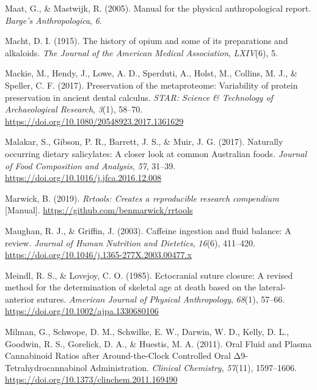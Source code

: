 \documentclass[
  11pt,
  leqno]{scrartcl}
\newlength{\cslhangindent}
\newenvironment{CSLReferences}[2] %
 {\begin{list}{}{%
  \setlength{\itemindent}{0pt}
  \setlength{\leftmargin}{0pt}
  \setlength{\parsep}{0pt}
  \ifodd #1
   \setlength{\leftmargin}{\cslhangindent}
   \setlength{\itemindent}{-1\cslhangindent}
  \fi
  \setlength{\itemsep}{#2\baselineskip}}}
 {\end{list}}
\begin{document}
\begin{CSLReferences}{1}{0}
Maat, G., \& Mastwijk, R. (2005). Manual for the physical
anthropological report. \emph{Barge's Anthropologica}, \emph{6}.

Macht, D. I. (1915). The history of opium and some of its preparations
and alkaloids. \emph{The Journal of the American Medical Association},
\emph{LXIV}(6), 5.

Mackie, M., Hendy, J., Lowe, A. D., Sperduti, A., Holst, M., Collins, M.
J., \& Speller, C. F. (2017). Preservation of the metaproteome:
Variability of protein preservation in ancient dental calculus.
\emph{STAR: Science \& Technology of Archaeological Research},
\emph{3}(1), 58--70. \url{https://doi.org/10.1080/20548923.2017.1361629}

Malakar, S., Gibson, P. R., Barrett, J. S., \& Muir, J. G. (2017).
Naturally occurring dietary salicylates: {A} closer look at common
{Australian} foods. \emph{Journal of Food Composition and Analysis},
\emph{57}, 31--39. \url{https://doi.org/10.1016/j.jfca.2016.12.008}

Marwick, B. (2019). \emph{Rrtools: {Creates} a reproducible research
compendium} {[}Manual{]}. \url{https://github.com/benmarwick/rrtools}

Maughan, R. J., \& Griffin, J. (2003). Caffeine ingestion and fluid
balance: A review. \emph{Journal of Human Nutrition and Dietetics},
\emph{16}(6), 411--420.
\url{https://doi.org/10.1046/j.1365-277X.2003.00477.x}

Meindl, R. S., \& Lovejoy, C. O. (1985). Ectocranial suture closure: {A}
revised method for the determination of skeletal age at death based on
the lateral-anterior sutures. \emph{American Journal of Physical
Anthropology}, \emph{68}(1), 57--66.
\url{https://doi.org/10.1002/ajpa.1330680106}

Milman, G., Schwope, D. M., Schwilke, E. W., Darwin, W. D., Kelly, D.
L., Goodwin, R. S., Gorelick, D. A., \& Huestis, M. A. (2011). Oral
{Fluid} and {Plasma Cannabinoid Ratios} after {Around-the-Clock
Controlled Oral Δ9-Tetrahydrocannabinol Administration}. \emph{Clinical
Chemistry}, \emph{57}(11), 1597--1606.
\url{https://doi.org/10.1373/clinchem.2011.169490}


\end{CSLReferences}
\end{document}

